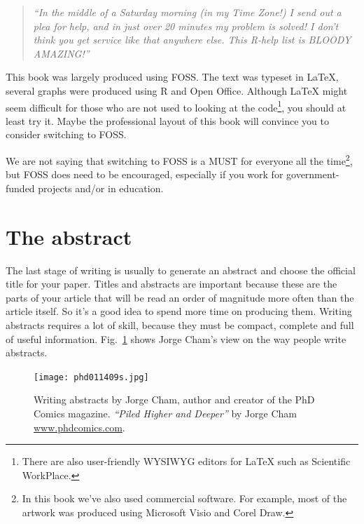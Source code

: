 \documentclass[graybox,envcountchap,sectrefs,UStrade]{svmono}
\begin{document}
\begin{quote}
    \emph{``In the middle of a Saturday morning (in my Time Zone!) I send out a plea for help, and in just over 20 minutes my problem is solved! I don't think you get service like that anywhere else. This R-help list is BLOODY AMAZING!''}
\end{quote}

This book was largely produced using FOSS. The text was typeset in {\LaTeX}, several graphs were produced using \textsf{R} and Open Office. Although {\LaTeX} might seem difficult for those who are not used to looking at the code\footnote{There are also user-friendly WYSIWYG editors for {\LaTeX} such as \textsf{Scientific WorkPlace}.}, you should at least try it. Maybe the professional layout of this book will convince you to consider switching to FOSS. \par

We are not saying that switching to FOSS is a MUST for everyone all the time\footnote{In this book we've also used commercial software. For example, most of the artwork was produced using Microsoft \textsf{Visio} and \textsf{Corel Draw}.}, but FOSS does need to be encouraged, especially if you work for government-funded projects and/or in education.\par


\section{The abstract}

The last stage of writing is usually to generate an abstract and choose the official title for your paper. Titles and abstracts are important because these are the parts of your article that will be read an order of magnitude more often than the article itself. So it's a good idea to spend more time on producing them. Writing abstracts requires a lot of skill, because they must be compact, complete and full of useful information. Fig.\@~\ref{Fig:cham_abstracts} shows Jorge Cham's view on the way people write abstracts.\par

\begin{figure}[!htb]
\begin{center}
  \texttt{[image: phd011409s.jpg]}\\
\caption{Writing abstracts by Jorge Cham, author and creator of the PhD Comics magazine. \emph{``Piled Higher and Deeper''} by Jorge Cham \url{www.phdcomics.com}.} \label{Fig:cham_abstracts}
\end{center}
\end{figure}
\end{document}

